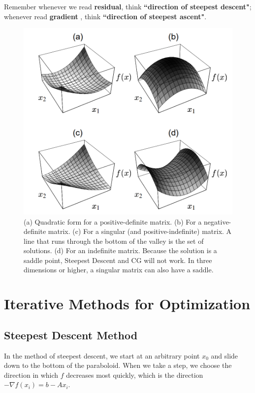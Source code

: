 \documentclass{article}
\begin{document}
Remember whenever we read \textbf{residual}, think \textbf{“direction of steepest descent"}; whenever read \textbf{gradient} , think \textbf{“direction of steepest ascent"}.
\begin{figure}[H]
   \centering
   \includegraphics[scale=0.3]{quadraticform.png}
   \caption{(a) Quadratic form for a positive-definite matrix. (b) For a negative-definite matrix. (c) For a singular (and positive-indefinite) matrix. A line that runs through the bottom of the valley is the set of solutions. (d) For an indefinite matrix. Because the solution is a saddle point, Steepest Descent and CG will not work. In three dimensions or higher, a singular matrix can also have a saddle.}
   \label{fig:quadratic}
\end{figure}


\section{Iterative Methods for Optimization}
\subsection{Steepest Descent Method}
In the method of steepest descent, we start at an arbitrary point $x_0$ and slide down to the bottom of the paraboloid. When we take a step, we choose the direction in which $f$ decreases most quickly, which is the direction $-\nabla f(x_i)= b-Ax_i$. 
\end{document}
